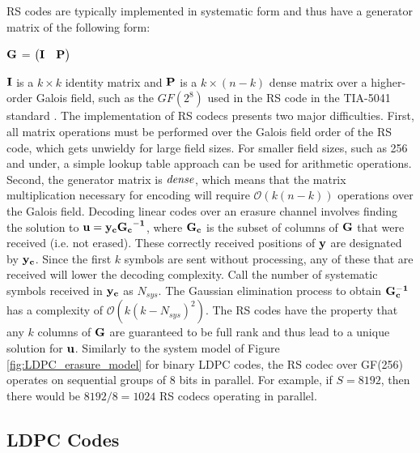 \documentclass[conference]{IEEEtran}
\begin{document}
RS codes are typically implemented in systematic form and thus have a generator matrix of the following form:

$\bf{G}$ =
$\begin{pmatrix}
 \bf{I} & \bf{P}\\
\end{pmatrix}$

$\bf{I}$ is a $k \times k$ identity matrix and $\bf{P}$ is a $k \times (n-k)$ dense matrix over a higher-order Galois field, such as the $GF(2^8)$ used in the RS code in the TIA-5041 standard \cite{TIA5041_standard}.
The implementation of RS codecs presents two major difficulties.  First, all matrix operations must be performed over the Galois field order of the RS code, which gets unwieldy for large field sizes.  For smaller field sizes, such as 256 and under, a simple lookup table approach can be used for arithmetic operations.  Second, the generator matrix is $\it{dense}$, which means that the matrix multiplication necessary for encoding will require $\mathcal O(k(n-k))$ operations over the Galois field.  Decoding linear codes over an erasure channel involves finding the solution to $\bf{u} = \bf{y}_c{\bf{G}_c}^{-1}$, where $\bf{G}_c$ is the subset of columns of $\bf{G}$ that were received (i.e. not erased).  These correctly received positions of $\bf{y}$ are designated by $\bf{y}_c$.  Since the first $k$ symbols are sent without processing, any of these that are received will lower the decoding complexity.  Call the number of systematic symbols received in $\bf{y}_c$ as $N_{sys}$.  The Gaussian elimination process to obtain $\bf{G}_c^{-1}$ has a complexity of $\mathcal O(k(k-N_{sys})^2)$.  The RS codes have the property that any $k$ columns of $\bf{G}$ are guaranteed to be full rank and thus lead to a unique solution for $\bf{u}$.  Similarly to the system model of Figure \ref{fig:LDPC_erasure_model} for binary LDPC codes, the RS codec over GF(256) operates on sequential groups of 8 bits in parallel.  For example, if $S=8192$, then there would be $8192/8=1024$ RS codecs operating in parallel.

\subsection{LDPC Codes}
\end{document}
